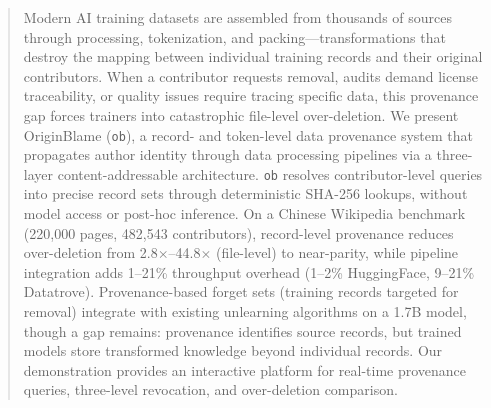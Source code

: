
\begin{abstract}
Modern AI training datasets are assembled from thousands of sources through processing, tokenization, and packing---transformations that destroy the mapping between individual training records and their original contributors. When a contributor requests removal, audits demand license traceability, or quality issues require tracing specific data, this provenance gap forces trainers into catastrophic file-level over-deletion. We present OriginBlame (\texttt{ob}), a record- and token-level data provenance system that propagates author identity through data processing pipelines via a three-layer content-addressable architecture. \texttt{ob} resolves contributor-level queries into precise record sets through deterministic SHA-256 lookups, without model access or post-hoc inference. On a Chinese Wikipedia benchmark (220,000 pages, 482,543 contributors), record-level provenance reduces over-deletion from 2.8$\times$--44.8$\times$ (file-level) to near-parity, while pipeline integration adds 1--21\% throughput overhead (1--2\% HuggingFace, 9--21\% Datatrove). Provenance-based forget sets (training records targeted for removal) integrate with existing unlearning algorithms on a 1.7B model, though a gap remains: provenance identifies source records, but trained models store transformed knowledge beyond individual records. Our demonstration provides an interactive platform for real-time provenance queries, three-level revocation, and over-deletion comparison.
\end{abstract}
